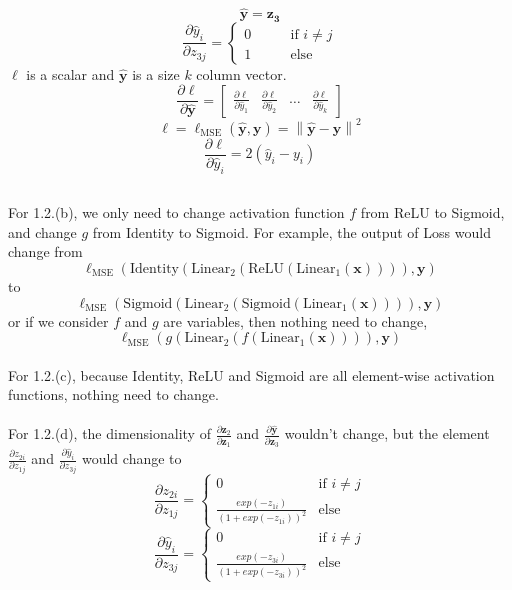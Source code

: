 \documentclass[a4paper]{article}
\newcommand\norm[1]{\left\lVert#1\right\rVert}
\begin{document}
$$\bm{\hat{y}}=\bm{z_3}$$
$$\frac{\partial{\hat{y}_i}}{\partial{z_{3j}}}=\begin{cases}
	0 \qquad & \text{if }i\neq j \\
	1 \qquad & \text{else}
\end{cases}$$
$\ell$ is a scalar and $\bm{\hat{y}}$ is a size $k$ column vector.
$$\frac{\partial{\ell}}{\partial{\bm{\hat{y}}}}=
\begin{bmatrix}
	\frac{\partial{\ell}}{\partial{\hat{y}_1}} & \frac{\partial{\ell}}{\partial{\hat{y}_2}} & \dots & \frac{\partial{\ell}}{\partial{\hat{y}_k}}
\end{bmatrix}$$
$$\ell=\ell_{\text{MSE}}(\bm{\hat{y}}, \bm{y}) = \norm{\bm{\hat{y}}-\bm{y}}^2$$
$$\frac{\partial{\ell}}{\partial{\hat{y}_i}}=2(\hat{y}_i-y_i)$$

\subsection{}
\subsubsection{} %
For 1.2.(b), we only need to change activation function $f$ from ReLU to Sigmoid, and change $g$ from Identity to Sigmoid. For example, the output of Loss would change from 
$$\ell_{\text{MSE}}(\text{Identity}(\text{Linear}_2(\text{ReLU}(\text{Linear}_1(\bm{x})))), \bm{y})$$
 to
$$\ell_{\text{MSE}}(\text{Sigmoid}(\text{Linear}_2(\text{Sigmoid}(\text{Linear}_1(\bm{x})))), \bm{y})$$
or if we consider $f$ and $g$ are variables, then nothing need to change,
$$\ell_{\text{MSE}}(g(\text{Linear}_2(f(\text{Linear}_1(\bm{x})))), \bm{y})$$
\\
For 1.2.(c), because Identity, ReLU and Sigmoid are all element-wise activation functions, nothing need to change. \\\\
For 1.2.(d), the dimensionality of $\frac{\partial{\bm{z}_2}}{\partial{\bm{z}_1}}$ and $\frac{\partial{\bm{\hat{y}}}}{\partial{\bm{z}_3}}$ wouldn't change, but the element $\frac{\partial{z_{2i}}}{\partial{z_{1j}}}$ and $\frac{\partial{\hat{y}_i}}{\partial{z_{3j}}}$ would change to 
$$\frac{\partial{z_{2i}}}{\partial{z_{1j}}}=\begin{cases}
	0 \qquad & \text{if } i\neq j \\
	\frac{exp(-z_{1i})}{(1+exp(-z_{1i}))^2} & \text{else}
\end{cases}$$
$$\frac{\partial{\hat{y}_i}}{\partial{z_{3j}}}=\begin{cases}
	0 \qquad & \text{if } i\neq j \\
	\frac{exp(-z_{3i})}{(1+exp(-z_{3i}))^2} & \text{else}
\end{cases}$$
\end{document}
